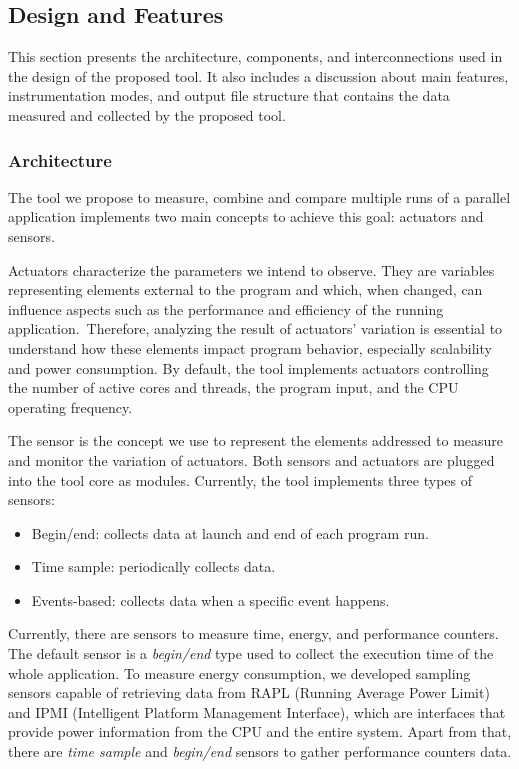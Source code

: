 \subsection{Design and Features} \label{sec:design_and_features_pascal}

This section presents the architecture, components, and interconnections used in the design of the proposed tool. It also includes a discussion about main features, instrumentation modes, and output file structure that contains the data measured and collected by the proposed tool.

\subsubsection{Architecture} \label{subsec:architecture_pascal}
The tool we propose to measure, combine and compare multiple runs of a parallel application implements two main concepts to achieve this goal: actuators and sensors.

Actuators characterize the parameters we intend to observe. They are variables representing elements external to the program and which, when changed, can influence aspects such as the performance and efficiency of the running application.~Therefore, analyzing the result of actuators' variation is essential to understand how these elements impact program behavior, especially scalability and power consumption. By default, the tool implements actuators controlling the number of active cores and threads, the program input, and the CPU operating frequency.

The sensor is the concept we use to represent the elements addressed to measure and monitor the variation of actuators. Both sensors and actuators are plugged into the tool core as modules. Currently, the tool implements three types of sensors:

\begin{itemize}
	\item Begin/end: collects data at launch and end of each program run.
	\item Time sample: periodically collects data.
	\item Events-based: collects data when a specific event happens.
\end{itemize}

Currently, there are sensors to measure time, energy, and performance counters. The default sensor is a \textit{begin/end} type used to collect the execution time of the whole application. To measure energy consumption, we developed sampling sensors capable of retrieving data from RAPL (Running Average Power Limit) and IPMI (Intelligent Platform Management Interface), which are interfaces that provide power information from the CPU
and the entire system. Apart from that, there are \textit{time sample} and \textit{begin/end} sensors to gather performance counters data.

